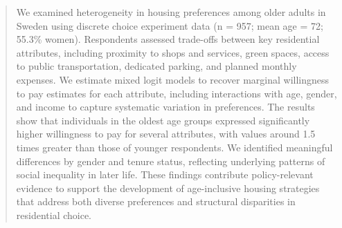 \documentclass[3p,11pt ]{elsarticle}
\begin{document}
\begin{frontmatter}
                 
                 
                 
%


\begin{abstract}
We examined heterogeneity in housing preferences among older adults in Sweden using discrete choice experiment data (n = 957; mean age = 72; 55.3\% women). Respondents assessed trade-offs between key residential attributes, including proximity to shops and services, green spaces, access
to public transportation, dedicated parking, and planned monthly expenses. We estimate mixed logit models to recover marginal willingness to pay estimates for each attribute, including interactions with age, gender, and income to capture systematic variation in preferences. The results show that individuals in the oldest age groups expressed significantly higher willingness to pay for several attributes, with values around 1.5 times greater than those of younger respondents. We identified meaningful differences by gender and tenure status, reflecting underlying patterns of social inequality in later life. These findings contribute policy-relevant evidence to support the development of age-inclusive housing strategies that address both diverse preferences and structural disparities in residential choice. 


\end{abstract}
\end{frontmatter}
\end{document}
